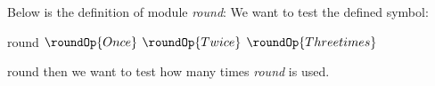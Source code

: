 \documentclass{omdoc}
\begin{document}
Below is the definition of module \emph{round}:
We want to test the defined symbol: 
\begin{importmodule}{round}
$\roundOp{Once}$
$\roundOp{Twice}$
$\roundOp{Three times}$
\end{importmodule}{round}
then we want to test how many times \emph{round} is used.
\end{document}
